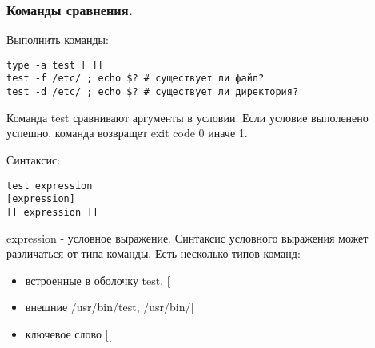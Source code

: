 \begin{frame}[fragile]
   \frametitle{Команды сравнения.}

\underline{Выполнить команды:}
	\small\begin{lstlisting}
type -a test [ [[
test -f /etc/ ; echo $? # существует ли файл?
test -d /etc/ ; echo $? # существует ли директория?
	\end{lstlisting}

\pause
\alert{Команда test} сравнивают аргументы в условии. Если условие выполенено успешно, команда возвращет exit code \alert{0} иначе \alert{1}.

Синтаксис:
\begin{verbatim}
test expression 
[expression] 
[[ expression ]]
\end{verbatim}
expression - условное выражение. Синтаксис условного выражения может различаться от типа команды.
Есть несколько типов команд:

\begin{itemize}
    \item встроенные в оболочку test, [
    \item внешние /usr/bin/test, /usr/bin/[
    \item ключевое слово [[
\end{itemize}


\end{frame}

